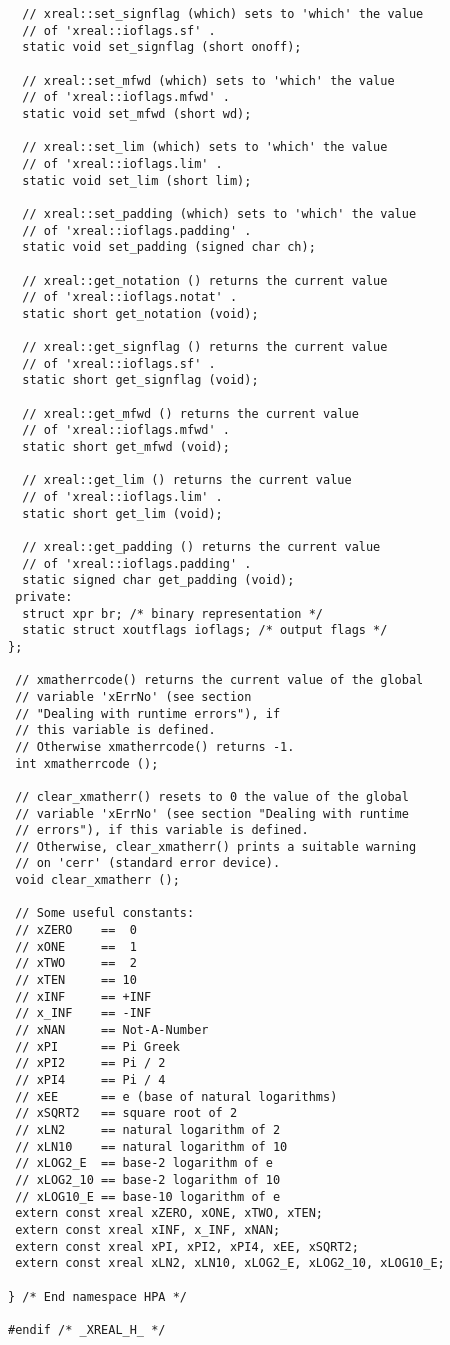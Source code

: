\documentclass{article}
\begin{document}
\begin{verbatim}
  // xreal::set_signflag (which) sets to 'which' the value
  // of 'xreal::ioflags.sf' .
  static void set_signflag (short onoff);

  // xreal::set_mfwd (which) sets to 'which' the value
  // of 'xreal::ioflags.mfwd' .
  static void set_mfwd (short wd);

  // xreal::set_lim (which) sets to 'which' the value
  // of 'xreal::ioflags.lim' .
  static void set_lim (short lim);

  // xreal::set_padding (which) sets to 'which' the value
  // of 'xreal::ioflags.padding' .
  static void set_padding (signed char ch);

  // xreal::get_notation () returns the current value
  // of 'xreal::ioflags.notat' .
  static short get_notation (void);

  // xreal::get_signflag () returns the current value
  // of 'xreal::ioflags.sf' .
  static short get_signflag (void);

  // xreal::get_mfwd () returns the current value
  // of 'xreal::ioflags.mfwd' .
  static short get_mfwd (void);

  // xreal::get_lim () returns the current value
  // of 'xreal::ioflags.lim' .
  static short get_lim (void);

  // xreal::get_padding () returns the current value
  // of 'xreal::ioflags.padding' .
  static signed char get_padding (void);
 private:
  struct xpr br; /* binary representation */
  static struct xoutflags ioflags; /* output flags */
};

 // xmatherrcode() returns the current value of the global
 // variable 'xErrNo' (see section 
 // "Dealing with runtime errors"), if
 // this variable is defined. 
 // Otherwise xmatherrcode() returns -1. 
 int xmatherrcode ();

 // clear_xmatherr() resets to 0 the value of the global
 // variable 'xErrNo' (see section "Dealing with runtime
 // errors"), if this variable is defined. 
 // Otherwise, clear_xmatherr() prints a suitable warning
 // on 'cerr' (standard error device).
 void clear_xmatherr ();

 // Some useful constants:
 // xZERO    ==  0
 // xONE     ==  1
 // xTWO     ==  2
 // xTEN     == 10
 // xINF     == +INF
 // x_INF    == -INF
 // xNAN     == Not-A-Number
 // xPI      == Pi Greek
 // xPI2     == Pi / 2
 // xPI4     == Pi / 4
 // xEE      == e (base of natural logarithms)
 // xSQRT2   == square root of 2
 // xLN2     == natural logarithm of 2
 // xLN10    == natural logarithm of 10
 // xLOG2_E  == base-2 logarithm of e
 // xLOG2_10 == base-2 logarithm of 10 
 // xLOG10_E == base-10 logarithm of e
 extern const xreal xZERO, xONE, xTWO, xTEN;
 extern const xreal xINF, x_INF, xNAN;
 extern const xreal xPI, xPI2, xPI4, xEE, xSQRT2;
 extern const xreal xLN2, xLN10, xLOG2_E, xLOG2_10, xLOG10_E;

} /* End namespace HPA */

#endif /* _XREAL_H_ */
\end{verbatim}
\end{document}
